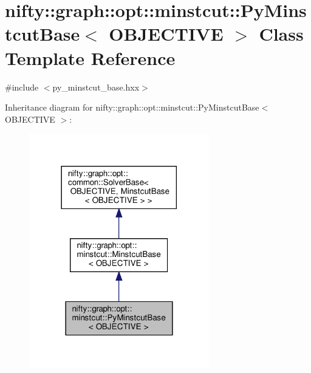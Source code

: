 \hypertarget{classnifty_1_1graph_1_1opt_1_1minstcut_1_1PyMinstcutBase}{}\section{nifty\+:\+:graph\+:\+:opt\+:\+:minstcut\+:\+:Py\+Minstcut\+Base$<$ O\+B\+J\+E\+C\+T\+I\+VE $>$ Class Template Reference}
\label{classnifty_1_1graph_1_1opt_1_1minstcut_1_1PyMinstcutBase}


{\ttfamily \#include $<$py\+\_\+minstcut\+\_\+base.\+hxx$>$}



Inheritance diagram for nifty\+:\+:graph\+:\+:opt\+:\+:minstcut\+:\+:Py\+Minstcut\+Base$<$ O\+B\+J\+E\+C\+T\+I\+VE $>$\+:
\nopagebreak
\begin{figure}[H]
\begin{center}
\leavevmode
\includegraphics[width=222pt]{classnifty_1_1graph_1_1opt_1_1minstcut_1_1PyMinstcutBase__inherit__graph}
\end{center}
\end{figure}


